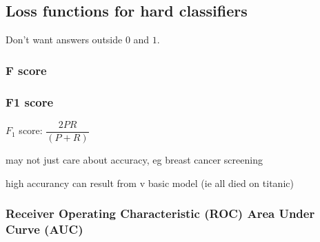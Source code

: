 
\subsection{Loss functions for hard classifiers}

Don't want answers outside \(0\) and \(1\).

\subsubsection{F score}

\subsubsection{F1 score}

\(F_1\) score: \(\dfrac{2PR}{(P+R)}\)

may not just care about accuracy, eg breast cancer screening

high accurancy can result from v basic model (ie all died on titanic)

\subsubsection{Receiver Operating Characteristic (ROC) Area Under Curve (AUC)}

